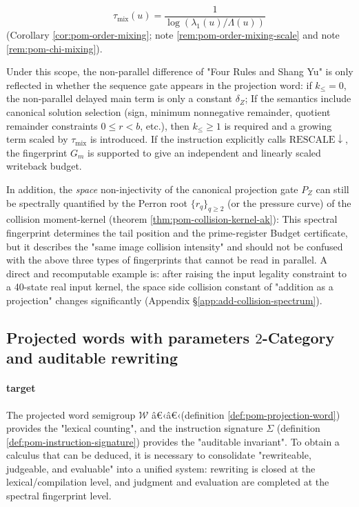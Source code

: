 \begin{remark}
\begin{itemize}
\[  \qquad
  \tau_{\mathrm{mix}}(u)=\frac{1}{\log(\lambda_1(u)/\Lambda(u))}
  \]
  (Corollary \ref{cor:pom-order-mixing}; note \ref{rem:pom-order-mixing-scale} and note \ref{rem:pom-chi-mixing}).
\end{itemize}
Under this scope, the non-parallel difference of "Four Rules and Shang Yu" is only reflected in whether the sequence gate appears in the projection word: if \(k_{\le}=0\), the non-parallel delayed main term is only a constant \(\delta_Z\);
If the semantics include canonical solution selection (sign, minimum nonnegative remainder, quotient remainder constraints \(0\le r<b\), etc.), then \(k_{\le}\ge 1\) is required and a growing term scaled by \(\tau_{\mathrm{mix}}\) is introduced.
If the instruction explicitly calls \(\mathrm{RESCALE}\downarrow\), the fingerprint \(G_m\) is supported to give an independent and linearly scaled writeback budget.
\par
In addition, the \emph{space} non-injectivity of the canonical projection gate \(P_Z\) can still be spectrally quantified by the Perron root \(\{r_q\}_{q\ge 2}\) (or the pressure curve) of the collision moment-kernel (theorem \ref{thm:pom-collision-kernel-ak}): This spectral fingerprint determines the tail position and the prime-register Budget certificate, but it describes the "same image collision intensity" and should not be confused with the above three types of fingerprints that cannot be read in parallel.
A direct and recomputable example is: after raising the input legality constraint to a 40-state real input kernel, the space side collision constant of "addition as a projection" changes significantly (Appendix \S\ref{app:add-collision-spectrum}).
\end{remark}

\subsection{Projected words with parameters \texorpdfstring{$2$}{2}-Category and auditable rewriting}\label{subsec:pom-2cat-rewrite}
\paragraph{target}
The projected word semigroup $\mathcal W$ â€‹â€‹(definition \ref{def:pom-projection-word}) provides the "lexical counting", and the instruction signature $\Sigma$ (definition \ref{def:pom-instruction-signature}) provides the "auditable invariant".
To obtain a calculus that can be deduced, it is necessary to consolidate "rewriteable, judgeable, and evaluable" into a unified system: rewriting is closed at the lexical/compilation level, and judgment and evaluation are completed at the spectral fingerprint level.

